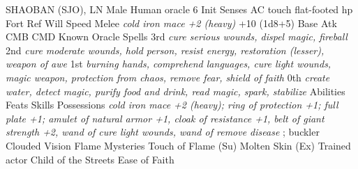 SHAOBAN (SJO), LN Male Human oracle 6  Init Senses  AC touch flat-footed  hp  Fort Ref Will  Speed  Melee  {\itshape cold iron mace +2 (heavy)} +10 (1d8+5)  Base Atk CMB CMD  Known Oracle Spells  3rd  {\itshape cure serious wounds, dispel magic, fireball}   2nd  {\itshape cure moderate wounds, hold person, resist energy, restoration (lesser), weapon of awe}   1st  {\itshape burning hands, comprehend languages, cure light wounds, magic weapon, protection from chaos, remove fear, shield of faith}   0th  {\itshape create water, detect magic, purify food and drink, read magic, spark, stabilize}   Abilities  Feats  Skills  Possessions  {\itshape cold iron mace +2 (heavy); ring of protection +1; full plate +1; amulet of natural armor +1, cloak of resistance +1, belt of giant strength +2, wand of cure light wounds, wand of remove disease} ; buckler Clouded Vision  Flame Mysteries  Touch of Flame (Su)   Molten Skin (Ex) Trained actor  Child of the Streets  Ease of Faith 